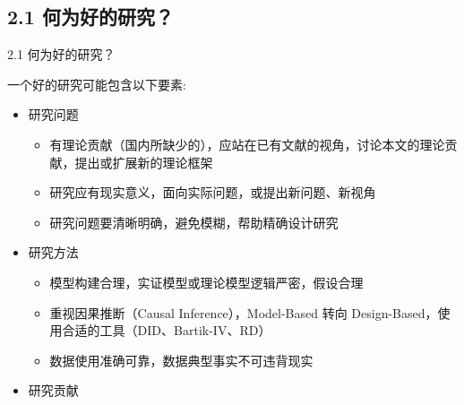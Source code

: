 \documentclass[10pt,aspectratio=43,mathserif,table]{beamer}
\begin{document}
\subsection{2.1 何为好的研究？}
\begin{frame}{\small 2.1 何为好的研究？}
	
	\begin{block}{\footnotesize 一个好的研究可能包含以下要素:}
		\begin{itemize}
			\vspace{0.7em}
			\item \footnotesize 研究问题
			\begin{itemize}
				\item \footnotesize 有理论贡献（国内所缺少的），应站在已有文献的视角，讨论本文的理论贡献，提出或扩展新的理论框架 
			\end{itemize}
			
			\begin{itemize}
				\item \footnotesize 研究应有现实意义，面向实际问题，或提出新问题、新视角
			\end{itemize}
			
			\begin{itemize}
				\item \footnotesize 研究问题要清晰明确，避免模糊，帮助精确设计研究
			\end{itemize}
			
			\vspace{0.7em}
			\item \footnotesize 研究方法
			
			\begin{itemize}
				\item \footnotesize 模型构建合理，实证模型或理论模型逻辑严密，假设合理
			\end{itemize}
			
			\begin{itemize}
				\item \footnotesize 重视因果推断（Causal Inference），Model-Based 转向 Design-Based，使用合适的工具（DID、Bartik-IV、RD）
			\end{itemize}
			
			\begin{itemize}
				\item \footnotesize 数据使用准确可靠，数据典型事实不可违背现实
			\end{itemize}
			
			\vspace{0.7em}
			\item \footnotesize 研究贡献
			

\end{itemize}
\end{block}
\end{frame}
\end{document}
